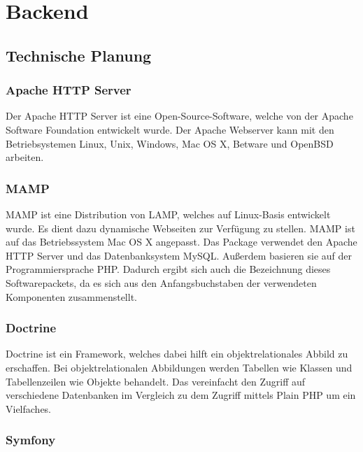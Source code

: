 \section{Backend}

  \subsection{Technische Planung}

    \subsubsection{Apache HTTP Server}

	Der Apache HTTP Server ist eine Open-Source-Software, welche von der Apache Software Foundation entwickelt wurde. Der Apache Webserver kann mit den Betriebsystemen Linux, Unix, Windows, Mac OS X, Betware und OpenBSD arbeiten.

    \subsubsection{MAMP}

	MAMP ist eine Distribution von LAMP, welches auf Linux-Basis entwickelt wurde. Es dient dazu dynamische Webseiten zur Verfügung zu stellen. MAMP ist auf das Betriebssystem Mac OS X angepasst. Das Package verwendet den Apache HTTP Server und das Datenbanksystem MySQL. Außerdem basieren sie auf der Programmiersprache PHP. Dadurch ergibt sich auch die Bezeichnung dieses Softwarepackets, da es sich aus den Anfangsbuchstaben der verwendeten Komponenten zusammenstellt.

    \subsubsection{Doctrine}

	Doctrine ist ein Framework, welches dabei hilft ein objektrelationales Abbild zu erschaffen. Bei objektrelationalen Abbildungen werden Tabellen wie Klassen und Tabellenzeilen wie Objekte behandelt. Das vereinfacht den Zugriff auf verschiedene Datenbanken im Vergleich zu dem Zugriff mittels Plain PHP um ein Vielfaches.

    \subsubsection{Symfony}

